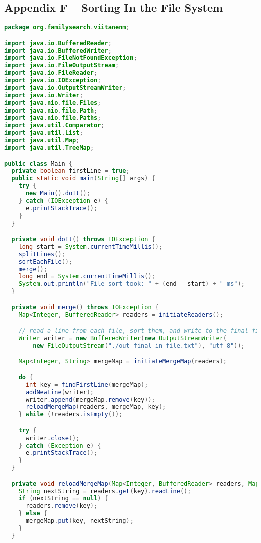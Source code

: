 \subsection*{Appendix F -- Sorting In the File System} \label{App:AppendixG}
\begin{lstlisting}[language=Java]
package org.familysearch.viitanenm;

import java.io.BufferedReader;
import java.io.BufferedWriter;
import java.io.FileNotFoundException;
import java.io.FileOutputStream;
import java.io.FileReader;
import java.io.IOException;
import java.io.OutputStreamWriter;
import java.io.Writer;
import java.nio.file.Files;
import java.nio.file.Path;
import java.nio.file.Paths;
import java.util.Comparator;
import java.util.List;
import java.util.Map;
import java.util.TreeMap;

public class Main {
  private boolean firstLine = true;
  public static void main(String[] args) {
    try {
      new Main().doIt();
    } catch (IOException e) {
      e.printStackTrace();
    }
  }

  private void doIt() throws IOException {
    long start = System.currentTimeMillis();
    splitLines();
    sortEachFile();
    merge();
    long end = System.currentTimeMillis();
    System.out.println("File sort took: " + (end - start) + " ms");
  }

  private void merge() throws IOException {
    Map<Integer, BufferedReader> readers = initiateReaders();

    // read a line from each file, sort them, and write to the final file.
    Writer writer = new BufferedWriter(new OutputStreamWriter(
        new FileOutputStream("./out-final-in-file.txt"), "utf-8"));

    Map<Integer, String> mergeMap = initiateMergeMap(readers);

    do {
      int key = findFirstLine(mergeMap);
      addNewLine(writer);
      writer.append(mergeMap.remove(key));
      reloadMergeMap(readers, mergeMap, key);
    } while (!readers.isEmpty());

    try {
      writer.close();
    } catch (Exception e) {
      e.printStackTrace();
    }
  }

  private void reloadMergeMap(Map<Integer, BufferedReader> readers, Map<Integer, String> mergeMap, int key) throws IOException {
    String nextString = readers.get(key).readLine();
    if (nextString == null) {
      readers.remove(key);
    } else {
      mergeMap.put(key, nextString);
    }
  }


\end{lstlisting}
